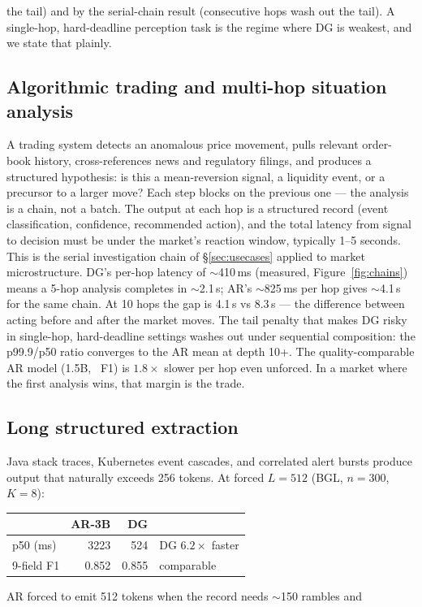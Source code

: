 the tail) and by the serial-chain result (consecutive hops wash out the
tail). A single-hop, hard-deadline perception task is the regime where DG
is weakest, and we state that plainly. \subsection{Algorithmic trading and multi-hop situation analysis} A trading system detects an anomalous price movement, pulls relevant
order-book history, cross-references news and regulatory filings, and
produces a structured hypothesis: is this a mean-reversion signal, a
liquidity event, or a precursor to a larger move? Each step blocks on the
previous one --- the analysis is a chain, not a batch. The output at each
hop is a structured record (event classification, confidence, recommended
action), and the total latency from signal to decision must be under the
market's reaction window, typically 1--5 seconds. This is the serial investigation chain of \S\ref{sec:usecases} applied to
market microstructure. DG's per-hop latency of $\sim$410\,ms (measured,
Figure~\ref{fig:chains}) means a 5-hop analysis completes in
$\sim$2.1\,s; AR's $\sim$825\,ms per hop gives $\sim$4.1\,s for the same
chain. At 10 hops the gap is 4.1\,s vs 8.3\,s --- the difference between
acting before and after the market moves. The tail penalty that makes DG
risky in single-hop, hard-deadline settings washes out under sequential
composition: the p99.9/p50 ratio converges to the AR mean at depth 10+. The quality-comparable AR model (1.5B, \arOneFiveFnine\ F1) is $1.8\times$
slower per hop even unforced. In a market where the first analysis wins,
that margin is the trade. \subsection{Long structured extraction} Java stack traces, Kubernetes event cascades, and correlated alert bursts
produce output that naturally exceeds 256 tokens. At forced $L{=}512$
(BGL, $n{=}300$, $K{=}8$): \begin{center}
\begin{tabular}{@{}lrrl@{}}
\toprule & AR-3B & DG & \\
\midrule
p50 (ms) & 3223 & 524 & DG $6.2\times$ faster \\
9-field F1 & 0.852 & 0.855 & comparable \\
\bottomrule
\end{tabular}
\end{center} AR forced to emit 512 tokens when the record needs $\sim$150 rambles and
